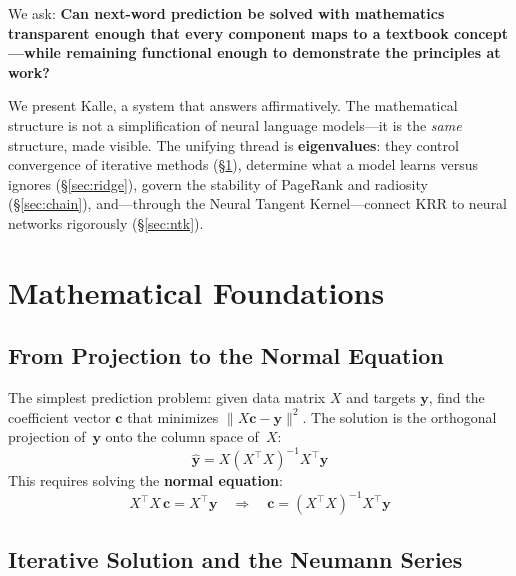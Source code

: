 \documentclass[11pt,a4paper]{article}
\begin{document}
We ask: \textbf{Can next-word prediction be solved with mathematics transparent enough that every component maps to a textbook concept---while remaining functional enough to demonstrate the principles at work?}

We present Kalle, a system that answers affirmatively. The mathematical structure is not a simplification of neural language models---it is the \emph{same} structure, made visible. The unifying thread is \textbf{eigenvalues}: they control convergence of iterative methods (\S\ref{sec:math}), determine what a model learns versus ignores (\S\ref{sec:ridge}), govern the stability of PageRank and radiosity (\S\ref{sec:chain}), and---through the Neural Tangent Kernel---connect KRR to neural networks rigorously (\S\ref{sec:ntk}).


\section{Mathematical Foundations}\label{sec:math}

\subsection{From Projection to the Normal Equation}

The simplest prediction problem: given data matrix $X$ and targets $\mathbf{y}$, find the coefficient vector $\mathbf{c}$ that minimizes $\|X\mathbf{c} - \mathbf{y}\|^2$. The solution is the orthogonal projection of~$\mathbf{y}$ onto the column space of~$X$:
\begin{equation}
  \hat{\mathbf{y}} = X(X^\top X)^{-1} X^\top \mathbf{y}
\end{equation}
This requires solving the \textbf{normal equation}:
\begin{equation}\label{eq:normal}
  X^\top X\,\mathbf{c} = X^\top \mathbf{y}
  \quad\Longrightarrow\quad
  \mathbf{c} = (X^\top X)^{-1} X^\top \mathbf{y}
\end{equation}

\subsection{Iterative Solution and the Neumann Series}
\end{document}
